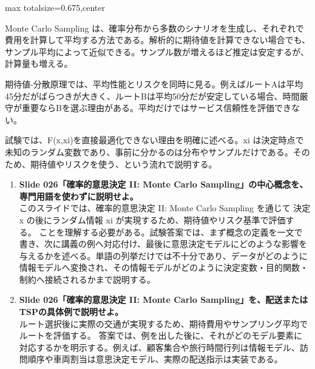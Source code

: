 \begin{adjustbox}{max totalsize={\textwidth}{0.675\textheight},center}
\begin{minipage}{\textwidth}
\begin{minipage}[t]{0.485\textwidth}
Monte Carlo Sampling は、確率分布から多数のシナリオを生成し、それぞれで費用を計算して平均する方法である。解析的に期待値を計算できない場合でも、サンプル平均によって近似できる。サンプル数が増えるほど推定は安定するが、計算量も増える。\par
期待値-分散原理では、平均性能とリスクを同時に見る。例えばルートAは平均45分だがばらつきが大きく、ルートBは平均50分だが安定している場合、時間厳守が重要ならBを選ぶ理由がある。平均だけではサービス信頼性を評価できない。\par
試験では、F(x,xi)を直接最適化できない理由を明確に述べる。xi は決定時点で未知のランダム変数であり、事前に分かるのは分布やサンプルだけである。そのため、期待値やリスクを使う、という流れで説明する。\par
{}
\begin{enumerate}
\item \textbf{Slide 026「確率的意思決定 II: Monte Carlo Sampling」の中心概念を、専門用語を使わずに説明せよ。}\\このスライドでは、確率的意思決定 II: Monte Carlo Sampling を通じて 決定 x の後にランダム情報 xi が実現するため、期待値やリスク基準で評価する。 ことを理解する必要がある。試験答案では、まず概念の定義を一文で書き、次に講義の例へ対応付け、最後に意思決定モデルにどのような影響を与えるかを述べる。単語の列挙だけでは不十分であり、データがどのように情報モデルへ変換され、その情報モデルがどのように決定変数・目的関数・制約へ接続されるかまで説明する。
\item \textbf{Slide 026「確率的意思決定 II: Monte Carlo Sampling」を、配送またはTSPの具体例で説明せよ。}\\ルート選択後に実際の交通が実現するため、期待費用やサンプリング平均でルートを評価する。 答案では、例を出した後に、それがどのモデル要素に対応するかを明示する。例えば、顧客集合や旅行時間行列は情報モデル、訪問順序や車両割当は意思決定モデル、実際の配送指示は実装である。
\end{enumerate}
\end{minipage}
\end{minipage}
\end{adjustbox}

